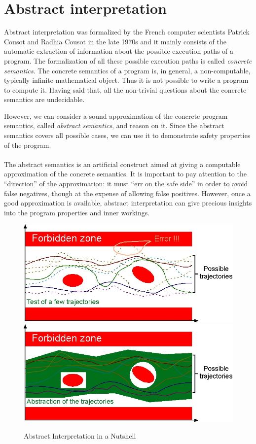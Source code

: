 \section{Abstract interpretation}
Abstract interpretation was formalized by the French computer scientists Patrick Cousot and Radhia Cousot in the late 1970s and it mainly consists of the automatic extraction of information about the possible execution paths of a program.
The formalization of all these possible execution paths is called \emph{concrete semantics}. The concrete semantics of a program is, in general, a non-computable, typically infinite mathematical object. Thus it is not possible to write a program to compute it. Having said that, all the non-trivial questions about the concrete semantics are undecidable. 

However, we can consider a sound approximation of the concrete program semantics, called \emph{abstract semantics}, and reason on it. Since the abstract semantics covers all possible cases, we can use it to demonstrate safety properties of the program.
\\\\
The abstract semantics is an artificial construct aimed at giving a computable approximation of the concrete semantics. It is important to pay attention to the ``direction'' of the approximation: it must ``err on the safe side'' in order to avoid false negatives, though at the expense of allowing false positives. 
However, once a good approximation is available, abstract interpretation can give precious insights into the program properties and inner workings. 

\begin{figure}[ht]
	\centering
	\includegraphics[width=1.0\textwidth]{Immagini/AbstractInterpretationNutshell_trajectories.jpeg}
  \includegraphics[width=1.0\textwidth]{Immagini/AbstractInterpretationNutshell_interpretation.jpeg}
	\caption{Abstract Interpretation in a Nutshell \cite{AbstractInterpretationNutshell}}
	\label{fig:one}
\end{figure}

